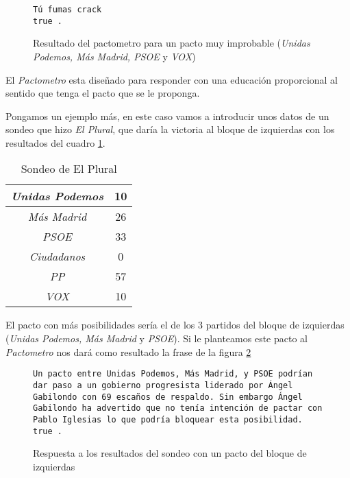 \documentclass[a4paper, 12pt]{article}
\begin{document}
\begin{figure}[ht!]
	\begin{verbatim}
Tú fumas crack
true .
	\end{verbatim}
	\caption{Resultado del pactometro para un pacto muy improbable 
	(\textit{Unidas Podemos, Más Madrid, PSOE} y \textit{VOX})}
	\label{f:pactometro_2}
\end{figure}

	El \textit{Pactometro} esta diseñado para responder con una educación
proporcional al sentido que tenga el pacto que se le proponga. \\\mbox{}

	Pongamos un ejemplo más, en este caso vamos a introducir unos datos de un 
sondeo que hizo \textit{El Plural}, que daría la victoria al bloque de 
izquierdas con los resultados del cuadro \ref{f:encuesta_plural}.\\\mbox{}

\begin{table}[ht!]
	\centering
	\begin{tabular}{|c|c|}
		\hline
		\textit{Unidas Podemos} & 10 \\\hline
		\textit{Más Madrid}		& 26 \\\hline
		\textit{PSOE}			& 33 \\\hline
		\textit{Ciudadanos}		& 0	 \\\hline
		\textit{PP}				& 57 \\\hline
		\textit{VOX}			& 10 \\\hline
	\end{tabular}
	\caption{Sondeo de El Plural}
	\label{f:encuesta_plural}
\end{table}

	El pacto con más posibilidades sería el de los 3 partidos del bloque de 
izquierdas (\textit{Unidas Podemos, Más Madrid} y \textit{PSOE}). Si le 
planteamos este pacto al \textit{Pactometro} nos dará como resultado la 
frase de la figura \ref{f:pactometro_3}\\\mbox{}

\begin{figure}[ht!]
	\begin{verbatim}
Un pacto entre Unidas Podemos, Más Madrid, y PSOE podrían dar paso a un gobierno progresista liderado por Ángel Gabilondo con 69 escaños de respaldo. Sin embargo Ángel Gabilondo ha advertido que no tenía intención de pactar con Pablo Iglesias lo que podría bloquear esta posibilidad.
true .
	\end{verbatim}
	\caption{Respuesta a los resultados del sondeo con un pacto del bloque de
	izquierdas}
	\label{f:pactometro_3}
\end{figure}
\end{document}
